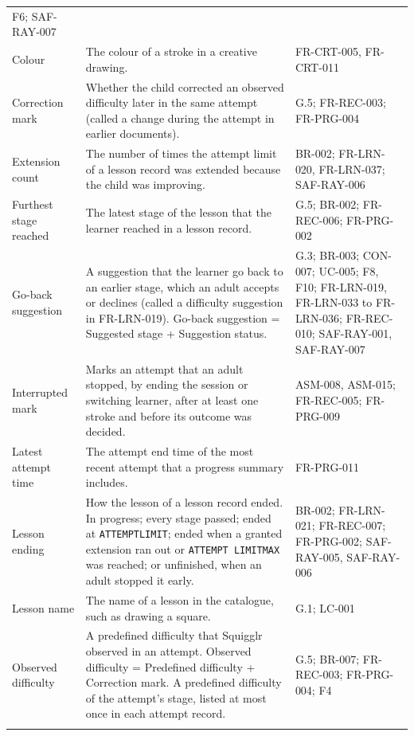 \documentclass[12pt]{article}
\renewcommand{\_}{\textunderscore\allowbreak}%
\begin{document}
{\begin{longtable}{@{}
  >{\raggedright\arraybackslash}p{}
  >{\raggedright\arraybackslash}p{}
  >{\raggedright\arraybackslash\exhyphenpenalty=10000}p{}@{}}
F6; SAF-RAY-007 \\
\addlinespace
Colour & The colour of a stroke in a creative drawing. & FR-CRT-005, FR-CRT-011 \\
\addlinespace
Correction mark & Whether the child corrected an observed difficulty later in
the same attempt (called a change during the attempt in earlier documents). & G.5; FR-REC-003; FR-PRG-004 \\
\addlinespace
Extension count & The number of times the attempt limit of a lesson record was
extended because the child was improving. & BR-002; FR-LRN-020, FR-LRN-037;
SAF-RAY-006 \\
\addlinespace
Furthest stage reached & The latest stage of the lesson that the learner reached
in a lesson record. & G.5; BR-002;
FR-REC-006; FR-PRG-002 \\
\addlinespace
Go-back suggestion & A suggestion that the learner go back to an earlier stage,
which an adult accepts or declines (called a difficulty suggestion in
FR-LRN-019). Go-back suggestion = Suggested stage + Suggestion status. & G.3; BR-003; CON-007; UC-005; F8, F10; FR-LRN-019, FR-LRN-033 to FR-LRN-036; FR-REC-010;
SAF-RAY-001, SAF-RAY-007 \\
\addlinespace
Interrupted mark & Marks an attempt that an adult stopped, by ending the session
or switching learner, after at least one stroke and before its outcome was
decided. & ASM-008, ASM-015; FR-REC-005; FR-PRG-009 \\
\addlinespace
Latest attempt time & The attempt end time of the most recent attempt that a
progress summary includes. & FR-PRG-011 \\
\addlinespace
Lesson ending & How the lesson of a lesson record ended. In
progress; every stage passed; ended at \texttt{ATTEMPT\_\allowbreak LIMIT};
ended when a granted extension ran out or \texttt{ATTEMPT\_\allowbreak
LIMIT\_\allowbreak MAX} was reached; or unfinished, when an adult stopped it
early. & BR-002; FR-LRN-021; FR-REC-007; FR-PRG-002; SAF-RAY-005, SAF-RAY-006 \\
\addlinespace
Lesson name & The name of a lesson in the catalogue, such as drawing a square. & G.1; LC-001 \\
\addlinespace
Observed difficulty & A predefined difficulty that Squigglr observed in an
attempt. Observed difficulty = Predefined difficulty + Correction mark. A predefined difficulty of the attempt's stage, listed at most once
in each attempt record. & G.5; BR-007; FR-REC-003; FR-PRG-004; F4 \\
\addlinespace

\end{longtable}}
\end{document}
